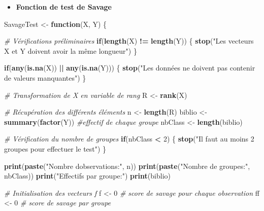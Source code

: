 \documentclass[
  12pt,
]{article}
\newenvironment{Shaded}{\begin{snugshade}}{\end{snugshade}}
\newcommand{\CommentTok}[1]{\textcolor[rgb]{0.56,0.35,0.01}{\textit{#1}}}
\newcommand{\ControlFlowTok}[1]{\textcolor[rgb]{0.13,0.29,0.53}{\textbf{#1}}}
\newcommand{\DecValTok}[1]{\textcolor[rgb]{0.00,0.00,0.81}{#1}}
\newcommand{\FunctionTok}[1]{\textcolor[rgb]{0.13,0.29,0.53}{\textbf{#1}}}
\newcommand{\NormalTok}[1]{#1}
\newcommand{\OtherTok}[1]{\textcolor[rgb]{0.56,0.35,0.01}{#1}}
\newcommand{\SpecialCharTok}[1]{\textcolor[rgb]{0.81,0.36,0.00}{\textbf{#1}}}
\newcommand{\StringTok}[1]{\textcolor[rgb]{0.31,0.60,0.02}{#1}}
\providecommand{\tightlist}{%
  \setlength{\itemsep}{0pt}\setlength{\parskip}{0pt}}
\begin{document}
\begin{itemize}
\tightlist
\item
  \textbf{Fonction de test de Savage}
\end{itemize}

\begin{Shaded}
\begin{Highlighting}[]
\NormalTok{SavageTest }\OtherTok{\textless{}{-}} \ControlFlowTok{function}\NormalTok{(X, Y) \{}
  
  \CommentTok{\# Vérifications préliminaires}
  \ControlFlowTok{if}\NormalTok{(}\FunctionTok{length}\NormalTok{(X) }\SpecialCharTok{!=} \FunctionTok{length}\NormalTok{(Y)) \{}
    \FunctionTok{stop}\NormalTok{(}\StringTok{"Les vecteurs X et Y doivent avoir la même longueur"}\NormalTok{)}
\NormalTok{  \}}
  
  \ControlFlowTok{if}\NormalTok{(}\FunctionTok{any}\NormalTok{(}\FunctionTok{is.na}\NormalTok{(X)) }\SpecialCharTok{||} \FunctionTok{any}\NormalTok{(}\FunctionTok{is.na}\NormalTok{(Y))) \{}
    \FunctionTok{stop}\NormalTok{(}\StringTok{"Les données ne doivent pas contenir de valeurs manquantes"}\NormalTok{)}
\NormalTok{  \}}
  
  \CommentTok{\# Transformation de X en variable de rang}
\NormalTok{  R }\OtherTok{\textless{}{-}} \FunctionTok{rank}\NormalTok{(X)}
  
  \CommentTok{\# Récupération des différents éléments}
\NormalTok{  n }\OtherTok{\textless{}{-}} \FunctionTok{length}\NormalTok{(R)}
\NormalTok{  biblio }\OtherTok{\textless{}{-}} \FunctionTok{summary}\NormalTok{(}\FunctionTok{factor}\NormalTok{(Y)) }\CommentTok{\#effectif de chaque groupe}
\NormalTok{  nbClass }\OtherTok{\textless{}{-}} \FunctionTok{length}\NormalTok{(biblio)}
  
  \CommentTok{\# Vérification du nombre de groupes}
  \ControlFlowTok{if}\NormalTok{(nbClass }\SpecialCharTok{\textless{}} \DecValTok{2}\NormalTok{) \{}
    \FunctionTok{stop}\NormalTok{(}\StringTok{"Il faut au moins 2 groupes pour effectuer le test"}\NormalTok{)}
\NormalTok{  \}}
  
  \FunctionTok{print}\NormalTok{(}\FunctionTok{paste}\NormalTok{(}\StringTok{"Nombre d\textquotesingle{}observations:"}\NormalTok{, n))}
  \FunctionTok{print}\NormalTok{(}\FunctionTok{paste}\NormalTok{(}\StringTok{"Nombre de groupes:"}\NormalTok{, nbClass))}
  \FunctionTok{print}\NormalTok{(}\StringTok{"Effectifs par groupe:"}\NormalTok{)}
  \FunctionTok{print}\NormalTok{(biblio)}
  
  \CommentTok{\# Initialisation des vecteurs f}
\NormalTok{  f }\OtherTok{\textless{}{-}} \DecValTok{0} \CommentTok{\# score de savage pour chaque observation}
\NormalTok{  ff }\OtherTok{\textless{}{-}} \DecValTok{0} \CommentTok{\# score de savage par groupe}
  

\end{Highlighting}
\end{Shaded}
\end{document}
